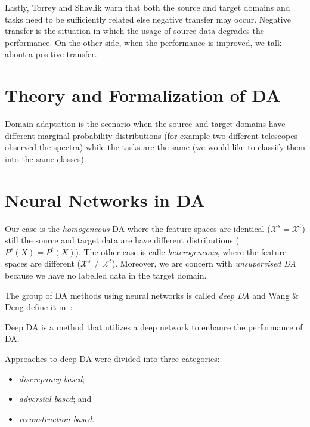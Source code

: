 Lastly, Torrey and Shavlik warn that both the source and target domains and tasks need to be sufficiently related
else negative transfer may occur.
Negative transfer is the situation in which the usage of source data degrades the performance.
On the other side, when the performance is improved,
we talk about a positive transfer.~\cite{torrey2010}

\section{Theory and Formalization of DA}

Domain adaptation is the scenario when the source and target domains have different marginal probability distributions
(for example two different telescopes observed the spectra)
while the tasks are the same
(we would like to classify them into the same classes).

\section{Neural Networks in DA}

Our case is the \textit{homogeneous} DA where the feature spaces are identical
(\(\mathcal{X}^s = \mathcal{X}^t\))
still the source and target data are have different distributions
(\(P^s(X) = P^t(X)\)).
The other case is calle \textit{heterogeneous},
where the feature spaces are different (\(\mathcal{X}^s \ne \mathcal{X}^t\)).
Moreover, we are concern with \textit{unsupervised DA} because we have
no labelled data in the target domain.~\cite{wang2018}

The group of DA methods using neural networks is called \textit{deep DA}
and Wang \& Deng define it in~\cite{wang2018}:

\begin{definition}
	Deep DA is a method that utilizes a deep network to enhance the performance of DA.
\end{definition}

Approaches to deep DA were divided into three categories:

\begin{itemize}
	\item \textit{discrepancy-based};
	\item \textit{adversial-based}; and
	\item \textit{reconstruction-based}.
\end{itemize}

